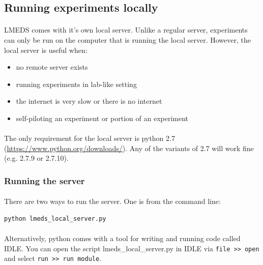 \documentclass[12pt, oneside]{scrbook}   	%
\begin{document}
\subsection{Running experiments locally} 

\paragraph{}
LMEDS comes with it's own local server.  Unlike a regular server, experiments can only be run on the computer that is running the local server.  However, the local server is useful when:

\begin{itemize}
\item no remote server exists
\item running experiments in lab-like setting
\item the internet is very slow or there is no internet
\item self-piloting an experiment or portion of an experiment
\end{itemize}

\paragraph{}
The only requirement for the local server is python 2.7 (\url{https://www.python.org/downloads/}).  Any of the variants of 2.7 will work fine (e.g. 2.7.9 or 2.7.10).

\subsubsection{Running the server}

\paragraph{}
There are two ways to run the server.  One is from the command line:

\begin{lstlisting}
python lmeds_local_server.py
\end{lstlisting}

\paragraph{}
Alternatively, python comes with a tool for writing and running code called IDLE.  You can open the script lmeds\_local\_server.py in IDLE via \texttt{file >> open} and select \texttt{run >> run module}.
\end{document}
